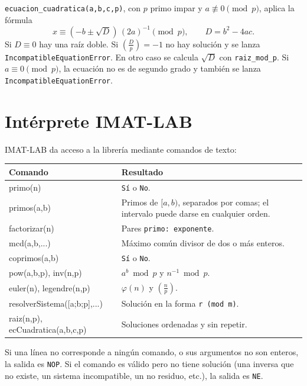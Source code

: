 \documentclass[11pt,a4paper]{article}
\renewcommand{\ttfamily}{\fontencoding{OT1}\fontfamily{cmtt}\selectfont}
\newcommand{\code}[1]{\texttt{#1}}
\begin{document}
\code{ecuacion\_cuadratica(a,b,c,p)}, con $p$ primo impar y $a\not\equiv0 \pmod p$, aplica la fórmula
\[
x\equiv(-b\pm\sqrt{D})\,(2a)^{-1} \pmod p,\qquad D=b^2-4ac .
\]
Si $D\equiv0$ hay una raíz doble. Si $\left(\frac{D}{p}\right)=-1$ no hay solución y se lanza \code{IncompatibleEquationError}. En otro caso se calcula $\sqrt{D}$ con \code{raiz\_mod\_p}. Si $a\equiv0 \pmod p$, la ecuación no es de segundo grado y también se lanza \code{IncompatibleEquationError}.

\section{Intérprete IMAT-LAB}

IMAT-LAB da acceso a la librería mediante comandos de texto:

\begin{center}
\small
\begin{tabularx}{\linewidth}{@{}>{\ttfamily}l X@{}}
\toprule
\normalfont\textbf{Comando} & \textbf{Resultado} \\
\midrule
primo(n) & \code{Sí} o \code{No}. \\
primos(a,b) & Primos de $[a,b)$, separados por comas; el intervalo puede darse en cualquier orden. \\
factorizar(n) & Pares \code{primo: exponente}. \\
mcd(a,b,...) & Máximo común divisor de dos o más enteros. \\
coprimos(a,b) & \code{Sí} o \code{No}. \\
pow(a,b,p), inv(n,p) & $a^b \bmod p$ y $n^{-1} \bmod p$. \\
euler(n), legendre(n,p) & $\varphi(n)$ y $\left(\frac{n}{p}\right)$. \\
resolverSistema([a;b;p],...) & Solución en la forma \code{r (mod m)}. \\
raiz(n,p), ecCuadratica(a,b,c,p) & Soluciones ordenadas y sin repetir. \\
\bottomrule
\end{tabularx}
\end{center}

Si una línea no corresponde a ningún comando, o sus argumentos no son enteros, la salida es \code{NOP}. Si el comando es válido pero no tiene solución (una inversa que no existe, un sistema incompatible, un no residuo, etc.), la salida es \code{NE}.
\end{document}
